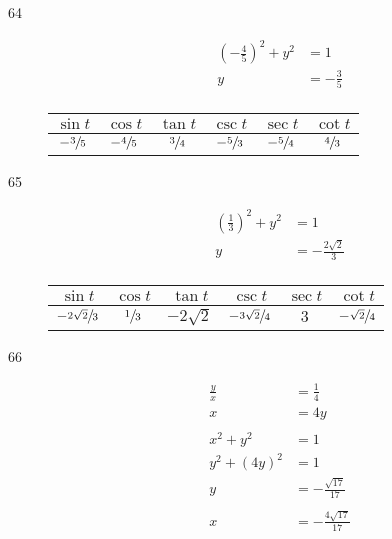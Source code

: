 \documentclass{exam}
\begin{document}
\begin{description}
      \item[64]
        \begin{align*}
          \left( - \frac{4}{5} \right)^2 + y^2 & = 1 \\
          y                                     & = -\frac{3}{5} \\
        \end{align*}

        \begin{tabular}[H]{cccccc}
          \toprule
          $\sin t$        & $\cos t$        & $\tan t$      & $\csc t$        & $\sec t$        & $\cot t$ \\
          \midrule
          $- \sfrac{3}{5}$ & $- \sfrac{4}{5}$ & $\sfrac{3}{4}$ & $- \sfrac{5}{3}$ & $- \sfrac{5}{4}$ & $\sfrac{4}{3}$ \\
          \bottomrule
        \end{tabular}

      \item[65]
        \begin{align*}
          \left( \frac{1}{3} \right)^2 + y^2 & = 1 \\
          y                                  & = - \frac{2 \sqrt{2}}{3} \\
        \end{align*}

        \begin{tabular}[H]{cccccc}
          \toprule
          $\sin t$                 & $\cos t$      & $\tan t$       & $\csc t$                 & $\sec t$ & $\cot t$ \\
          \midrule
          $- \sfrac{2 \sqrt{2}}{3}$ & $\sfrac{1}{3}$ & $- 2 \sqrt{2}$ & $- \sfrac{3 \sqrt{2}}{4}$ & $3$      & $- \sfrac{\sqrt{2}}{4}$ \\
          \bottomrule
        \end{tabular}

      \item[66]
        \begin{align*}
          \frac{y}{x}  & = \frac{1}{4} \\
          x            & = 4y \\
          \\
          x^2 + y^2    & = 1 \\
          y^2 + (4y)^2 & = 1 \\
          y            & = -\frac{\sqrt{17}}{17} \\
          \\
          x            & = -\frac{4 \sqrt{17}}{17} \\
        \end{align*}


\end{description}
\end{document}

